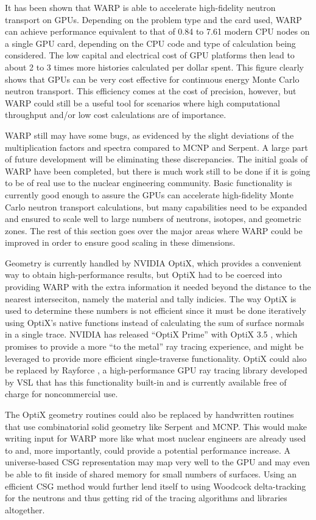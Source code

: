 \documentclass[preprint,12pt]{elsarticle}
\begin{document}
It has been shown that WARP is able to accelerate high-fidelity neutron transport on GPUs.  Depending on the problem type and the card used, WARP can achieve performance equivalent to that of 0.84 to 7.61 modern CPU nodes on a single GPU card, depending on the CPU code and type of calculation being considered.  The low capital and electrical cost of GPU platforms then lead to about 2 to 3 times more histories calculated per dollar spent.  This figure clearly shows that GPUs can be very cost effective for continuous energy Monte Carlo neutron transport.  This efficiency comes at the cost of precision, however, but WARP could still be a useful tool for scenarios where high computational throughput and/or low cost calculations are of importance.

WARP still may have some bugs, as evidenced by the slight deviations of the multiplication factors and spectra compared to MCNP and Serpent.  A large part of future development will be eliminating these discrepancies.  The initial goals of WARP have been completed, but there is much work still to be done if it is going to be of real use to the nuclear engineering community.  Basic functionality is currently good enough to assure the GPUs can accelerate high-fidelity Monte Carlo neutron transport calculations, but many capabilities need to be expanded and ensured to scale well to large numbers of neutrons, isotopes, and geometric zones.  The rest of this section goes over the major areas where WARP could be improved in order to ensure good scaling in these dimensions.    

Geometry is currently handled by NVIDIA OptiX, which provides a convenient way to obtain high-performance results, but OptiX had to be coerced into providing WARP with the extra information it needed beyond the distance to the nearest interseciton, namely the material and tally indicies.  The way OptiX is used to determine these numbers is not efficient since it must be done iteratively using OptiX's native functions instead of calculating the sum of surface normals in a single trace.  NVIDIA has released ``OptiX Prime'' with OptiX 3.5 \cite{optix3.5}, which promises to provide a more ``to the metal'' ray tracing experience, and might be leveraged to provide more efficient single-traverse functionality.  OptiX could also be replaced by Rayforce \cite{rayforce}, a high-performance GPU ray tracing library developed by VSL that has this functionality built-in and is currently available free of charge for noncommercial use.

The OptiX geometry routines could also be replaced by handwritten routines that use combinatorial solid geometry like Serpent and MCNP.  This would make writing input for WARP more like what most nuclear engineers are already used to and, more importantly, could provide a potential performance increase.  A universe-based CSG representation may map very well to the GPU and may even be able to fit inside of shared memory for small numbers of surfaces.  Using an efficient CSG method would further lend itself to using Woodcock delta-tracking for the neutrons and thus getting rid of the tracing algorithms and libraries altogether.   
\end{document}
